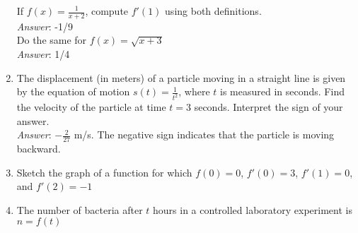 \documentclass[11pt]{article}
\begin{document}
\begin{enumerate}
If $f(x)=\frac{1}{x+2}$, compute $f'(1)$ using both definitions.\\

{\em Answer}: -1/9\\

Do the same for $f(x)=\sqrt{x+3}$\\

{\em Answer}: 1/4\\

\item The displacement (in meters) of a particle moving in a straight line is given by the equation of motion $s(t)=\frac{1}{t^2}$, where $t$ is measured in seconds. Find the velocity of the particle at time $t=3$ seconds. Interpret the sign of your answer.\\

{\em Answer}: $-\frac{2}{27}$ m/s. The negative sign indicates that the particle is moving backward.\\

\item Sketch the graph of a function for which $f(0)=0$, $f'(0)=3$, $f'(1)=0$, and $f'(2)=-1$\\














\item The number of bacteria after $t$ hours in a controlled laboratory experiment is $n=f(t)$


\end{enumerate}
\end{document}
